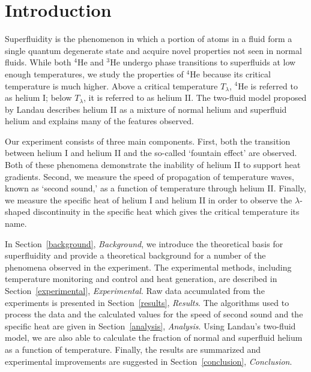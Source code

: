 
\section{Introduction}\label{introduction}

Superfluidity is the phenomenon in which a portion of atoms in a fluid form a single quantum degenerate state and acquire novel properties not seen in normal fluids. While both $^{4}$He and $^{3}$He undergo phase transitions to superfluids at low enough temperatures, we study the properties of $^{4}$He because its critical temperature is much higher. Above a critical temperature $T_{\lambda}$, $^{4}$He is referred to as helium I; below $T_{\lambda}$, it is referred to as helium II. The two-fluid model proposed by Landau \cite{landau} describes helium II as a mixture of normal helium and superfluid helium and explains many of the features observed.

Our experiment consists of three main components. First, both the transition between helium I and helium II and the so-called `fountain effect' are observed. Both of these phenomena demonstrate the inability of helium II to support heat gradients. Second, we measure the speed of propagation of temperature waves, known as `second sound,'  as a function of temperature through helium II. Finally, we measure the specific heat of helium I and helium II in order to observe the $\lambda$-shaped discontinuity in the specific heat which gives the critical temperature its name.

In Section~\ref{background}, \emph{Background}, we introduce the theoretical basis for superfluidity and provide a theoretical background for a number of the phenomena observed in the experiment. The experimental methods, including temperature monitoring and control and heat generation, are described in Section~\ref{experimental}, \emph{Experimental}. Raw data accumulated from the experiments is presented in Section~\ref{results}, \emph{Results}. The algorithms used to process the data and the calculated values for the speed of second sound and the specific heat are given in Section~\ref{analysis}, \emph{Analysis}. Using Landau's two-fluid model, we are also able to calculate the fraction of normal and superfluid helium as a function of temperature. Finally, the results are summarized and experimental improvements are suggested in Section~\ref{conclusion}, \emph{Conclusion}.